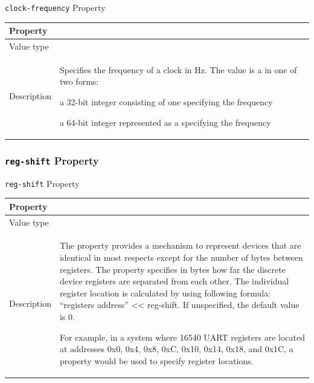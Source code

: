 \documentclass[a4paper,10pt,oneside]{sphinxmanual}
\begin{document}
\begin{threeparttable}
\capstart\caption{\texttt{clock-frequency} Property}\label{device-bindings:id2}
\begin{tabulary}{\linewidth}{l J}
\hline
\textsf{\relax 
Property
} & \textsf{\relax 
{}
}\\
\hline
Value type
 & 
\\
\hline
Description
 & 
Specifies the frequency of a clock in Hz. The value is a
 in one of two forms:

a 32-bit integer consisting of one  specifying the
frequency

a 64-bit integer represented as a  specifying the
frequency
\\
\hline\end{tabulary}

\end{threeparttable}



\subsubsection{\texttt{reg-shift} Property}
\label{device-bindings:reg-shift-property}

\begin{threeparttable}
\capstart\caption{\texttt{reg-shift} Property}\label{device-bindings:id3}
\begin{tabulary}{\linewidth}{l J}
\hline
\textsf{\relax 
Property
} & \textsf{\relax 
{}
}\\
\hline
Value type
 & 
\\
\hline
Description
 & 
The  property provides a mechanism to represent
devices that are identical in most respects except for the
number of bytes between registers. The  property
specifies in bytes how far the discrete device registers are
separated from each other. The individual register location
is calculated by using following formula: “registers address”
\textless{}\textless{} reg-shift. If unspecified, the default value is 0.

For example, in a system where 16540 UART registers are
located at addresses 0x0, 0x4, 0x8, 0xC, 0x10, 0x14, 0x18,
and 0x1C, a 
property would be used to specify register locations.
\\
\hline\end{tabulary}

\end{threeparttable}
\end{document}
